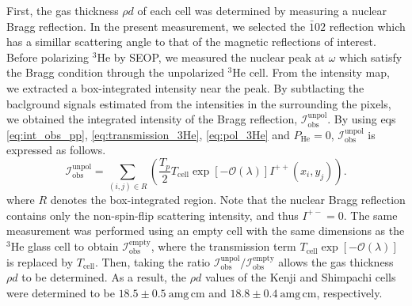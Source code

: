 \documentclass[%
 reprint,
superscriptaddress,
 amsmath,amssymb,
 aps,
floatfix,
]{revtex4-2}
\newcommand{\He}{$^3$He }
\begin{document}
    First, the gas thickness $\rho d$ of each cell was determined by measuring a nuclear Bragg reflection.
    In the present measurement, we selected the $\bar{1}02$ reflection which has a simillar scattering angle to that of the magnetic reflections of interest.
    Before polarizing \He by SEOP, we measured the nuclear peak at $\omega$ which satisfy the Bragg condition through the unpolarized \He cell.
    From the intensity map, we extracted a box-integrated intensity near the peak.
    By subtlacting the baclground signals estimated from the intensities in the surrounding the pixels, we obtained the integrated intensity of the Bragg reflection, $\mathcal{I}_\mathrm{obs}^\mathrm{unpol}$.
    By using eqs \ref{eq:int_obs_pp}, \ref{eq:transmission_3He}, \ref{eq:pol_3He} and $P_\mathrm{He}=0$, $\mathcal{I}_\mathrm{obs}^\mathrm{unpol}$ is expressed as follows.
    \begin{equation}
        \mathcal{I}^\mathrm{unpol}_\mathrm{obs}
        =\sum_{(i,j)\in R}
        \left(
        \frac{T_p}{2}
        T_\mathrm{cell}
        \exp[-\mathcal{O}(\lambda)]
        I^{++}(x_i,y_j)
        \right).
    \end{equation}
    where $R$ denotes the box-integrated region.
    Note that the nuclear Bragg reflection contains only the non-spin-flip scattering intensity, and thus $I^{+-} = 0$.
    The same measurement was performed using an empty cell with the same dimensions as the \He glass cell to obtain $\mathcal{I}^\mathrm{empty}_\mathrm{obs}$, where the transmission term $T_\mathrm{cell}\exp[-\mathcal{O}(\lambda)]$ is replaced by $T_\mathrm{cell}$.
    Then, taking the ratio $\mathcal{I}^\mathrm{unpol}_\mathrm{obs}/\mathcal{I}^\mathrm{empty}_\mathrm{obs}$ allows the gas thickness $\rho d$ to be determined.
    As a result, the $\rho d$ values of the Kenji and Shimpachi cells were determined to be $18.5 \pm 0.5~\mathrm{amg\,cm}$ and $18.8 \pm 0.4~\mathrm{amg\,cm}$, respectively.

\end{document}
